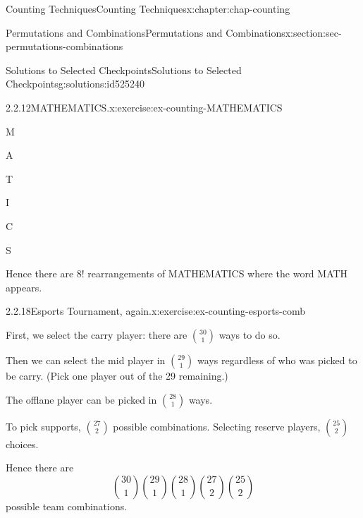 \documentclass[oneside,10pt,]{book}
\numberwithin{equation}{section}
\begin{document}
\begin{chapterptx}{Counting Techniques}{}{Counting Techniques}{}{}{x:chapter:chap-counting}
\begin{sectionptx}{Permutations and Combinations}{}{Permutations and Combinations}{}{}{x:section:sec-permutations-combinations}
\begin{solutions-subsection-numberless}{Solutions to Selected Checkpoints}{}{Solutions to Selected Checkpoints}{}{}{g:solutions:id525240}
\begin{inlinesolution}{2.2.12}{MATHEMATICS.}{x:exercise:ex-counting-MATHEMATICS}
\begin{sidebyside}{8}{0.02375}{0.02375}{0.0475}
\begin{sbspanel}{0.07}
M%
\end{sbspanel}%
\begin{sbspanel}{0.07}%
\par
A%
\end{sbspanel}%
\begin{sbspanel}{0.07}%
\par
T%
\end{sbspanel}%
\begin{sbspanel}{0.07}%
\par
I%
\end{sbspanel}%
\begin{sbspanel}{0.07}%
\par
C%
\end{sbspanel}%
\begin{sbspanel}{0.07}%
\par
S%
\end{sbspanel}%
\end{sidebyside}%
\par
Hence there are \(8!\) rearrangements of MATHEMATICS where the word MATH appears.%
\end{inlinesolution}%
\begin{inlinesolution}{2.2.18}{Esports Tournament, again.}{x:exercise:ex-counting-esports-comb}%
\par\smallskip%
\noindent\hypertarget{g:solution:id525033-main}{}First, we select the carry player: there are \(\displaystyle\binom{30}{1}\) ways to do so.%
\par
Then we can select the mid player in \(\displaystyle\binom{29}{1}\) ways regardless of who was picked to be carry. (Pick one player out of the 29 remaining.)%
\par
The offlane player can be picked in \(\displaystyle\binom{28}{1}\) ways.%
\par
To pick supports, \(\displaystyle\binom{27}{2}\) possible combinations. Selecting reserve players, \(\displaystyle\binom{25}{2}\) choices.%
\par
Hence there are%
\begin{equation*}
\binom{30}{1}\binom{29}{1}\binom{28}{1}\binom{27}{2}\binom{25}{2}
\end{equation*}
possible team combinations.%
\end{inlinesolution}%
\end{solutions-subsection-numberless}
\end{sectionptx}
%
%
\typeout{************************************************}
\typeout{************************************************}

\end{chapterptx}
\end{document}
